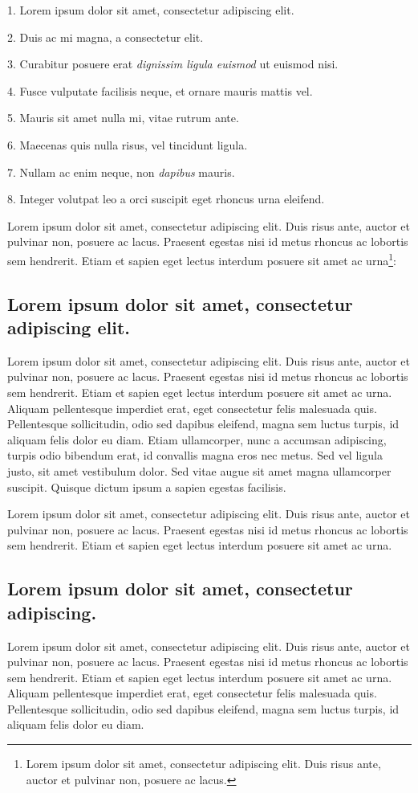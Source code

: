 \documentclass[a4paper,11pt,openany]{book}
\begin{document}
1. Lorem ipsum dolor sit amet, consectetur adipiscing elit.

2. Duis ac mi magna, a consectetur elit.

3. Curabitur posuere erat \emph{dignissim ligula euismod} ut euismod nisi.

4. Fusce vulputate facilisis neque, et ornare mauris mattis vel.

5. Mauris sit amet nulla mi, vitae rutrum ante.

6. Maecenas quis nulla risus, vel tincidunt ligula.

7. Nullam ac enim neque, non \emph{dapibus} mauris.

8. Integer volutpat leo a orci suscipit eget rhoncus urna eleifend.

\noindent Lorem ipsum dolor sit amet, consectetur adipiscing elit. Duis risus ante, auctor et pulvinar non, posuere ac lacus. Praesent egestas nisi id metus rhoncus ac lobortis sem hendrerit. Etiam et sapien eget lectus interdum posuere sit amet ac urna\footnote{Lorem ipsum dolor sit amet, consectetur adipiscing elit. Duis risus ante, auctor et pulvinar non, posuere ac lacus.}:

\subsection{Lorem ipsum dolor sit amet, consectetur adipiscing elit.}
Lorem ipsum dolor sit amet, consectetur adipiscing elit. Duis risus ante, auctor et pulvinar non, posuere ac lacus. Praesent egestas nisi id metus rhoncus ac lobortis sem hendrerit. Etiam et sapien eget lectus interdum posuere sit amet ac urna. Aliquam pellentesque imperdiet erat, eget consectetur felis malesuada quis. Pellentesque sollicitudin, odio sed dapibus eleifend, magna sem luctus turpis, id aliquam felis dolor eu diam. Etiam ullamcorper, nunc a accumsan adipiscing, turpis odio bibendum erat, id convallis magna eros nec metus. Sed vel ligula justo, sit amet vestibulum dolor. Sed vitae augue sit amet magna ullamcorper suscipit. Quisque dictum ipsum a sapien egestas facilisis.

Lorem ipsum dolor sit amet, consectetur adipiscing elit. Duis risus ante, auctor et pulvinar non, posuere ac lacus. Praesent egestas nisi id metus rhoncus ac lobortis sem hendrerit. Etiam et sapien eget lectus interdum posuere sit amet ac urna.

\subsection{Lorem ipsum dolor sit amet, consectetur adipiscing.}
Lorem ipsum dolor sit amet, consectetur adipiscing elit. Duis risus ante, auctor et pulvinar non, posuere ac lacus. Praesent egestas nisi id metus rhoncus ac lobortis sem hendrerit. Etiam et sapien eget lectus interdum posuere sit amet ac urna. Aliquam pellentesque imperdiet erat, eget consectetur felis malesuada quis. Pellentesque sollicitudin, odio sed dapibus eleifend, magna sem luctus turpis, id aliquam felis dolor eu diam.
\end{document}
